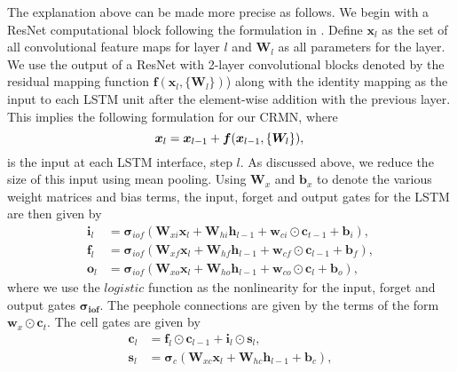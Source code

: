 \documentclass{article}
\begin{document}
The explanation above can be made more precise as follows. We begin with a ResNet computational block following the formulation in \cite{he2015deep}. Define $\boldsymbol{x}_l$ as the set of all convolutional feature maps for layer $l$ and $\boldsymbol{W}_l$ as all parameters for the layer. We use the output of a ResNet with 2-layer convolutional blocks denoted by the residual mapping function \(\boldsymbol{f}(\boldsymbol{x}_l, \{\boldsymbol{W}_l\})\)) along with the identity mapping as the input to each LSTM unit after the element-wise addition with the previous layer. This implies the following formulation for our CRMN, where
%
\begin{equation}
\boldsymbol{x}_l = \boldsymbol{x}_{l-1}+\boldsymbol{f}(\boldsymbol{x}_{l-1}, \{\boldsymbol{W}_l\}), \\
\end{equation}
%
is the input at each LSTM interface, step $l$. As discussed above, we reduce the size of this input using mean pooling. Using  $\boldsymbol{W}_x$ and $\boldsymbol{b}_x$ to denote the various weight matrices and bias terms, the input, forget and output gates for the LSTM are then given by
%
\begin{align}
\boldsymbol{i}_l &= \boldsymbol{\sigma}_{iof}(\boldsymbol{W}_{xi} \boldsymbol{x}_l  + \boldsymbol{W}_{hi} \boldsymbol{h}_{l-1} + \boldsymbol{w}_{ci} \odot \boldsymbol{c}_{t-1} + \boldsymbol{b}_i), \\
\boldsymbol{f}_l &= \boldsymbol{\sigma}_{iof}(\boldsymbol{W}_{xf} \boldsymbol{x}_l + \boldsymbol{W}_{hf} \boldsymbol{h}_{l-1}
       + \boldsymbol{w}_{cf}  \odot \boldsymbol{c}_{l-1} + \boldsymbol{b}_f), \\
       \boldsymbol{o}_l &= \boldsymbol{\sigma}_{iof}(\boldsymbol{W}_{xo} \boldsymbol{x}_l + \boldsymbol{W}_{ho} \boldsymbol{h}_{l-1} + \boldsymbol{w}_{co} \odot \boldsymbol{c}_l + \boldsymbol{b}_o),
\end{align}
%
where we use the \(logistic\) function as the nonlinearity for the input, forget and output gates \(\boldsymbol{\sigma_{iof}}\). %
The peephole connections are given by the terms of the form $\boldsymbol{w}_{x} \odot \boldsymbol{c}_t$.
%
The cell gates are given by
%
%
\begin{align}
\boldsymbol{c}_l &= \boldsymbol{f}_l  \odot \boldsymbol{c}_{l - 1}
       + \boldsymbol{i}_l \odot
       \boldsymbol{s}_l, \\
\boldsymbol{s}_l &=        \boldsymbol{\sigma}_c(\boldsymbol{W}_{xc} \boldsymbol{x}_l + \boldsymbol{W}_{hc} \boldsymbol{h}_{l-1} + \boldsymbol{b}_c),
\end{align}
\end{document}
